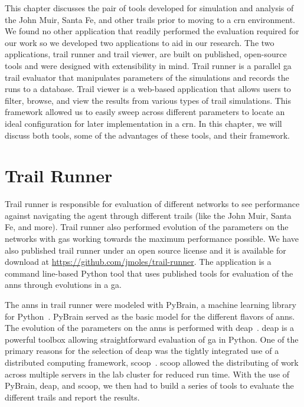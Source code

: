 This chapter discusses the pair of tools developed for simulation and analysis of the John Muir, Santa Fe, and other trails prior to moving to a \gls{crn} environment. We found no other application that readily performed the evaluation required for our work so we developed two applications to aid in our research. The two applications, trail runner and trail viewer, are built on published, open-source tools and were designed with extensibility in mind.  Trail runner is a parallel \gls{ga} trail evaluator that manipulates parameters of the simulations and records the runs to a database. Trail viewer is a web-based application that allows users to filter, browse, and view the results from various types of trail simulations. This framework allowed us to easily sweep across different parameters to locate an ideal configuration for later implementation in a \gls{crn}. In this chapter, we will discuss both tools, some of the advantages of these tools, and their framework.

\section{Trail Runner}
Trail runner is responsible for evaluation of different networks to see performance against navigating the agent through different trails (like the John Muir, Santa Fe, and more). Trail runner also performed evolution of the parameters on the networks with \glspl{ga} working towards the maximum performance possible. We have also published trail runner under an open source license and it is available for download at \url{https://github.com/jmoles/trail-runner}. The application is a command line-based Python tool that uses published tools for evaluation of the \glspl{ann} through evolutions in a \gls{ga}.

The \glspl{ann} in trail runner were modeled with PyBrain, a machine learning library for Python~\cite{Schaul2010-tu}. PyBrain served as the basic model for the different flavors of \glspl{ann}. The evolution of the parameters on the \glspl{ann} is performed with \gls{deap}~\cite{Fortin2012-yv}. \gls{deap} is a powerful toolbox allowing straightforward evaluation of \gls{ga} in Python. One of the primary reasons for the selection of \gls{deap} was the tightly integrated use of a distributed computing framework, \gls{scoop}~\cite{Hold-Geoffroy2014-qf}. \gls{scoop} allowed the distributing of work across multiple servers in the lab cluster for reduced run time. With the use of PyBrain, \gls{deap}, and \gls{scoop}, we then had to build a series of tools to evaluate the different trails and report the results.

